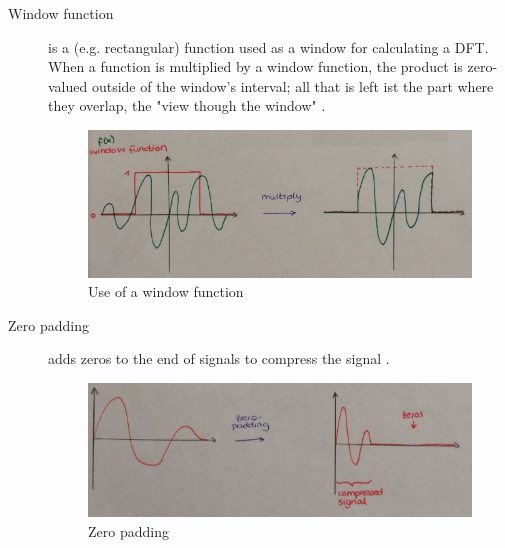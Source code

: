 \begin{description}
	\item[Window function] is a (e.g. rectangular) function used as a window for calculating a DFT. When a function is multiplied by a window function, the product is zero-valued outside of the window's interval; all that is left ist the part where they overlap, the "view though the window" .
		\begin{figure}[!h]
			\centering
			\includegraphics[width=0.7\linewidth]{images_LA/window}
			\caption{Use of a window function}
			\label{fig:window}
		\end{figure}
	
	\item[Zero padding] adds zeros to the end of signals to compress the signal .
		\begin{figure}[!h]
			\centering
			\includegraphics[width=0.7\linewidth]{images_LA/zerop}
			\caption{Zero padding}
			\label{fig:zerop}
		\end{figure}


	
\end{description}
